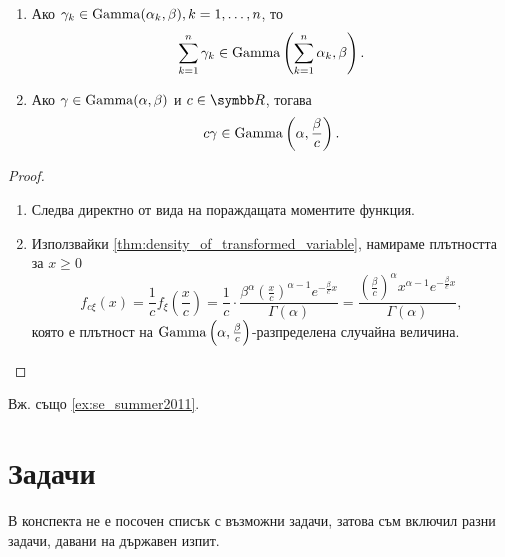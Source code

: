 \documentclass[
  headings=standardclasses,
  bibliography=totocnumbered,
]{scrartcl}
\begin{document}
\begin{proposition}\label{thm:gamma_linear_combination_is_gamma}
  \mbox{}
  \begin{enumerate}
    \item Ако \( \gamma_k \in \operatorname{Gamma}(\alpha_k, \beta), k = 1, \ldots, n \), то
    \begin{equation*}
      \sum_{k=1}^n \gamma_k \in \operatorname{Gamma}\left( \sum_{k=1}^n \alpha_k, \beta \right).
    \end{equation*}

    \item Ако \( \gamma \in \operatorname{Gamma}(\alpha, \beta) \) и \( c \in \R \), тогава
    \begin{equation*}
      c \gamma \in \operatorname{Gamma}\left(\alpha, \frac \beta c \right).
    \end{equation*}
  \end{enumerate}
\end{proposition}
\begin{proof}
  \mbox{}
  \begin{enumerate}
    \item Следва директно от вида на пораждащата моментите функция.
    \item Използвайки \cref{thm:density_of_transformed_variable}, намираме плътността за \( x \geq 0 \)
    \begin{equation*}
      f_{c\xi}(x)
      =
      \frac 1 c f_\xi\left(\frac x c \right)
      =
      \frac 1 c \cdot \frac {\beta^\alpha {\left(\frac x c \right)}^{\alpha-1} e^{-\frac \beta c x}} {\Gamma(\alpha)}
      =
      \frac {{\left(\frac \beta c \right)}^\alpha x^{\alpha-1} e^{-\frac \beta c x}} {\Gamma(\alpha)},
    \end{equation*}
    която е плътност на \( \operatorname{Gamma}\left(\alpha, \frac \beta c \right) \)-разпределена случайна величина.
  \end{enumerate}
\end{proof}

Вж. също \cref{ex:se_summer2011}.

\section{Задачи}

В конспекта не е посочен списък с възможни задачи, затова съм включил разни задачи, давани на държавен изпит.
\end{document}
